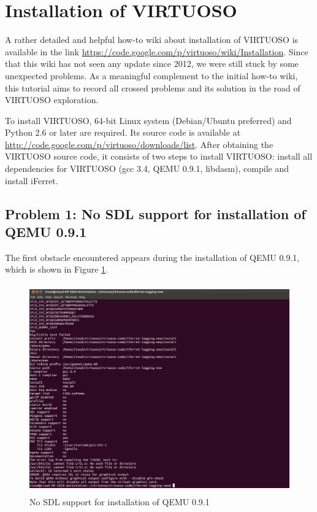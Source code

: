 \section{Installation of VIRTUOSO}

A rather detailed and helpful how-to wiki about installation of VIRTUOSO is available in the link 
\url{https://code.google.com/p/virtuoso/wiki/Installation}. Since that this wiki has not seen any update since 2012, 
we were still stuck by some unexpected problems.  As a meaningful complement to the initial how-to wiki, this tutorial aims to record 
all crossed problems and its solution in the road of VIRTUOSO exploration.

To install VIRTUOSO, 64-bit Linux system (Debian/Ubuntu preferred) and Python 2.6 or later are required. Its source code is available at 
\url{http://code.google.com/p/virtuoso/downloads/list}. After obtaining the VIRTUOSO source code, it consists of two steps to install VIRTUOSO:
install all dependencies for VIRTUOSO (gcc 3.4, QEMU 0.9.1, libdasm), compile and install iFerret.

\subsection{Problem 1: No SDL support for installation of QEMU 0.9.1}
The first obstacle encountered appears during the installation of QEMU 0.9.1, which is shown in Figure \ref{fig:No SDL support for installation of QEMU 0.9.1}.

\begin{figure}[htbp]
	\centering
		\includegraphics[width=14cm, height= 9cm ]{Figures/Figure32.png}
	\caption[No SDL support for installation of QEMU 0.9.1]{No SDL support for installation of QEMU 0.9.1}
	\label{fig:No SDL support for installation of QEMU 0.9.1}
\end{figure}

